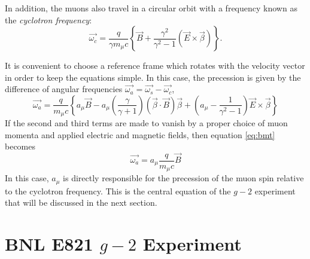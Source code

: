 \documentclass{outhesis}
\begin{document}
In addition, the muons also travel in a circular orbit with a frequency known as the \emph{cyclotron frequency}:
\begin{equation}
\overrightarrow{\omega_c} = \frac{q}{\gamma m_{\mu}c}\left\{\overrightarrow{B} + \frac{\gamma^2}{\gamma^2-1} \left(\overrightarrow{E} \times \overrightarrow{\beta}\right)\right\}.
\label{eq:c}
\end{equation}

It is convenient to choose a reference frame which rotates with the velocity vector in order to keep the equations simple. In this case, the precession is given by the difference of angular frequencies $\overrightarrow{\omega_a} = \overrightarrow{\omega_s} - \overrightarrow{\omega_c}$, 
\begin{equation}
\overrightarrow{\omega_a} =   \frac{q}{m_{\mu}c}\left\{a_{\mu}\overrightarrow{B}   -   a_{\mu}\left(\frac{\gamma}{\gamma + 1}\right)\left(\overrightarrow{\beta} \cdot \overrightarrow{B}\right)\overrightarrow{\beta} +   \left(a_{\mu}-\frac{1}{\gamma^2 - 1}\right)\overrightarrow{E} \times\overrightarrow{\beta}                 \right\}
\label{eq:bmt}
 \end{equation}
If the second and third terms are made to vanish by a proper choice of muon momenta and applied electric and magnetic fields, then equation \ref{eq:bmt} becomes
\begin{equation}
\overrightarrow{\omega_a} =   a_{\mu}\frac{q}{m_{\mu}c}\overrightarrow{B} 
\label{eq:wa}
\end{equation}
In this case, $a_{\mu}$ is directly responsible for the precession of the muon spin relative to the cyclotron frequency. This is the central equation of the $g-2$ experiment that will be discussed in the next section. 

\section{BNL E821 $g-2$ Experiment}
\end{document}
